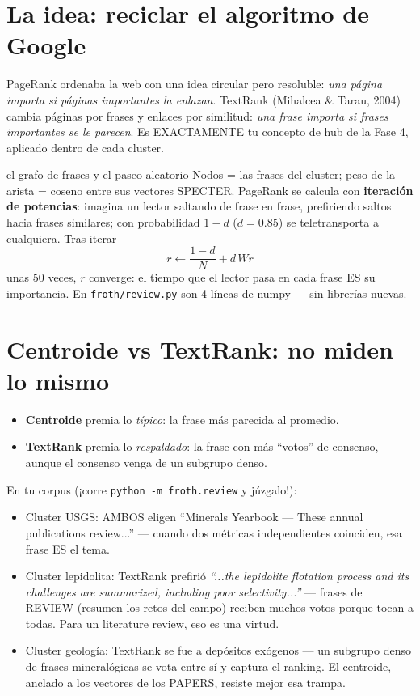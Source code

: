 \documentclass[11pt,a4paper]{article}
\begin{document}

\section{La idea: reciclar el algoritmo de Google}

PageRank ordenaba la web con una idea circular pero resoluble: \emph{una página importa
si páginas importantes la enlazan}. TextRank (Mihalcea \& Tarau, 2004) cambia páginas por
frases y enlaces por similitud: \emph{una frase importa si frases importantes se le
parecen}. Es EXACTAMENTE tu concepto de hub de la Fase 4, aplicado dentro de cada cluster.

\begin{concepto}{el grafo de frases y el paseo aleatorio}
Nodos = las frases del cluster; peso de la arista = coseno entre sus vectores SPECTER.
PageRank se calcula con \textbf{iteración de potencias}: imagina un lector saltando de
frase en frase, prefiriendo saltos hacia frases similares; con probabilidad $1-d$
($d=0.85$) se teletransporta a cualquiera. Tras iterar
\[
r \leftarrow \frac{1-d}{N} + d \, W r
\]
unas 50 veces, $r$ converge: el tiempo que el lector pasa en cada frase ES su importancia.
En \texttt{froth/review.py} son 4 líneas de numpy --- sin librerías nuevas.
\end{concepto}

\section{Centroide vs TextRank: no miden lo mismo}

\begin{itemize}
  \item \textbf{Centroide} premia lo \emph{típico}: la frase más parecida al promedio.
  \item \textbf{TextRank} premia lo \emph{respaldado}: la frase con más ``votos'' de
        consenso, aunque el consenso venga de un subgrupo denso.
\end{itemize}

En tu corpus (¡corre \texttt{python -m froth.review} y júzgalo!):

\begin{itemize}
  \item Cluster USGS: AMBOS eligen ``Minerals Yearbook --- These annual publications
        review...'' --- cuando dos métricas independientes coinciden, esa frase ES el tema.
  \item Cluster lepidolita: TextRank prefirió \emph{``...the lepidolite flotation process
        and its challenges are summarized, including poor selectivity...''} --- frases de
        REVIEW (resumen los retos del campo) reciben muchos votos porque tocan a todas.
        Para un literature review, eso es una virtud.
  \item Cluster geología: TextRank se fue a depósitos exógenos --- un subgrupo denso de
        frases mineralógicas se vota entre sí y captura el ranking. El centroide, anclado
        a los vectores de los PAPERS, resiste mejor esa trampa.
\end{itemize}
\end{document}
